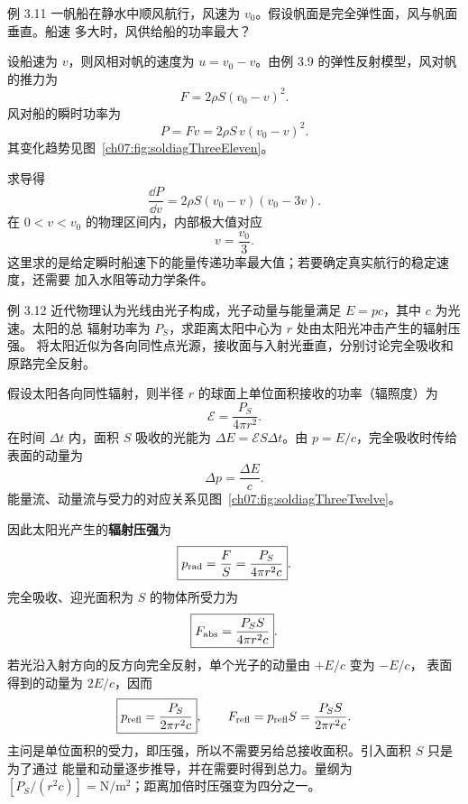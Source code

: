 \begin{origexamplebox}{例 3.11}
一帆船在静水中顺风航行，风速为 $v_0$。假设帆面是完全弹性面，风与帆面垂直。船速
多大时，风供给船的功率最大？
\end{origexamplebox}

\begin{xesolution}
设船速为 $v$，则风相对帆的速度为 $u=v_0-v$。由例 3.9 的弹性反射模型，风对帆的推力为
\[
 F=2\rho S(v_0-v)^2.
\]
风对船的瞬时功率为
\[
 P=Fv=2\rho S\,v(v_0-v)^2.
\]
其变化趋势见图~\ref{ch07:fig:soldiagThreeEleven}。

\soldiagThreeEleven
求导得
\[
 \frac{\dd P}{\dd v}=2\rho S(v_0-v)(v_0-3v).
\]
在 $0<v<v_0$ 的物理区间内，内部极大值对应
\[
 \boxed{v=\frac{v_0}{3}}.
\]
这里求的是给定瞬时船速下的能量传递功率最大值；若要确定真实航行的稳定速度，还需要
加入水阻等动力学条件。
\end{xesolution}

\begin{origexamplebox}{例 3.12}
近代物理认为光线由光子构成，光子动量与能量满足 $E=pc$，其中 $c$ 为光速。太阳的总
辐射功率为 $P_S$，求距离太阳中心为 $r$ 处由太阳光冲击产生的辐射压强。
将太阳近似为各向同性点光源，接收面与入射光垂直，分别讨论完全吸收和原路完全反射。
\end{origexamplebox}

\begin{xesolution}
假设太阳各向同性辐射，则半径 $r$ 的球面上单位面积接收的功率（辐照度）为
\[
 \mathcal E=\frac{P_S}{4\pi r^2}.
\]
在时间 $\Delta t$ 内，面积 $S$ 吸收的光能为 $\Delta E=\mathcal E S\Delta t$。由
$p=E/c$，完全吸收时传给表面的动量为
\[
 \Delta p=\frac{\Delta E}{c}.
\]
能量流、动量流与受力的对应关系见图~\ref{ch07:fig:soldiagThreeTwelve}。

\soldiagThreeTwelve
因此太阳光产生的\textbf{辐射压强}为
\[
 \boxed{p_{\rm rad}=\frac{F}{S}
 =\frac{P_S}{4\pi r^2c}}.
\]
完全吸收、迎光面积为 $S$ 的物体所受力为
\[
 \boxed{F_{\rm abs}=\frac{P_SS}{4\pi r^2c}}.
\]
若光沿入射方向的反方向完全反射，单个光子的动量由 $+E/c$ 变为 $-E/c$，
表面得到的动量为 $2E/c$，因而
\[
 \boxed{p_{\rm refl}=\frac{P_S}{2\pi r^2c}},\qquad
 F_{\rm refl}=p_{\rm refl}S=\frac{P_SS}{2\pi r^2c}.
\]
主问是单位面积的受力，即压强，所以不需要另给总接收面积。引入面积 $S$ 只是为了通过
能量和动量逐步推导，并在需要时得到总力。量纲为
$[P_S/(r^2c)]=\mathrm{N/m^2}$；距离加倍时压强变为四分之一。
\end{xesolution}
